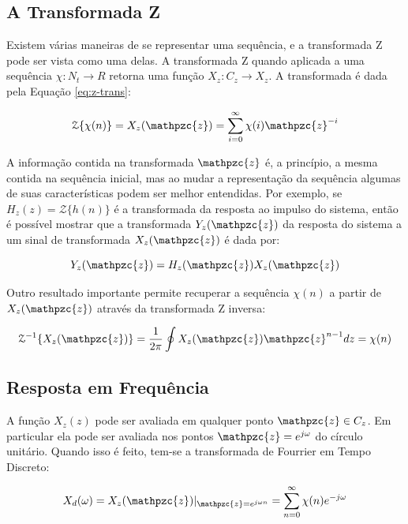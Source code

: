 {\subsection{A Transformada Z}

Existem várias maneiras de se representar uma sequência, e a transformada Z pode
ser vista como uma delas. A transformada Z quando aplicada a uma sequência
$\chi:N_t\rightarrow R$ retorna uma função $X_z:C_z\rightarrow X_z$. A
transformada é dada pela Equação \ref{eq:z-trans}:

\begin{equation}
\mathcal{Z} \{ \chi(n) \} = X_z(\mathpzc{z}) = \sum_{i=0}^{\infty} \chi(i)\mathpzc{z}^{-i}
\label{eq:z-trans}
\end{equation}


A informação contida na transformada $\mathpzc{z}$ é, a princípio, a mesma
contida na sequência inicial, mas ao mudar a representação da sequência algumas
de suas características podem ser melhor entendidas. Por exemplo, se $H_z(z) =
\mathcal{Z}\{h(n)\}$ é a transformada da resposta ao impulso do sistema, então é
possível mostrar que a transformada $Y_z(\mathpzc{z})$ da resposta do sistema a
um sinal de transformada $X_z(\mathpzc{z})$ é dada por:

\begin{equation}
Y_z(\mathpzc{z}) = H_z(\mathpzc{z})X_z(\mathpzc{z})
\end{equation}

Outro resultado importante permite recuperar a sequência $\chi(n)$ a partir de
$X_z(\mathpzc{z})$ através da transformada Z inversa:

\begin{equation}
\mathcal{Z}^{-1}\{X_z(\mathpzc{z})\} = \frac{1}{2 \pi} \oint X_z(\mathpzc{z}) \mathpzc{z}^{n-1}dz = \chi(n)
\end{equation}

\subsection{Resposta em Frequência}

A função $X_z(z)$ pode ser avaliada em qualquer ponto $\mathpzc{z} \in C_z$. Em
particular ela pode ser avaliada nos pontos $\mathpzc{z} = e^{j\omega}$ do
círculo unitário. Quando isso é feito, tem-se a transformada de Fourrier em
Tempo Discreto:

\begin{equation}
\label{eq:DFT-transform}
X_d(\omega) = X_z(\mathpzc{z})|_{\mathpzc{z} = e^{j\omega n}} = \sum _{n=0}^{\infty} \chi(n) e^{-j\omega} 
\end{equation}

}
